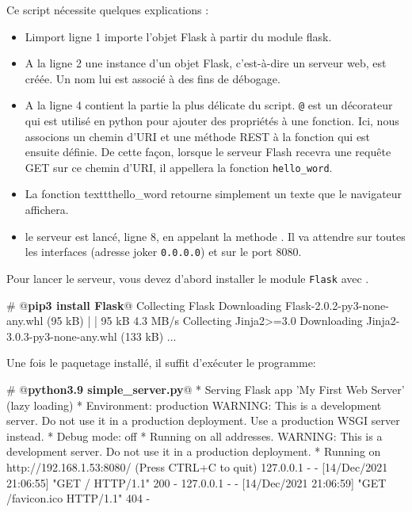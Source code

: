  
 Ce script nécessite quelques explications :

\begin{itemize}
    \item Limport ligne 1 importe l'objet Flask à partir du module flask.
    \item A la ligne 2 une instance d'un objet Flask, c'est-à-dire un serveur web, est créée. Un nom lui est associé à des fins de débogage.
    \item A la ligne 4 contient la partie la plus délicate du script. \texttt{@} est un décorateur qui est utilisé en python pour ajouter des propriétés à une fonction. Ici, nous associons un chemin d'URI et une méthode REST à la fonction qui est ensuite définie. De cette façon, lorsque le serveur Flash recevra une requête GET sur ce chemin d'URI, il appellera la fonction \texttt{hello\_word}.
    \item La fonction texttt{hello\_word} retourne simplement un texte que le navigateur affichera.
    \item le serveur est lancé, ligne 8, en appelant la methode . Il va attendre sur toutes les interfaces (adresse joker \texttt{0.0.0.0}) et sur le port 8080. 
\end{itemize}

  \vspace{1em}

Pour lancer le serveur, vous devez d'abord installer le module \texttt{Flask} avec \texttt{}.

\begin{termc}[backgroundcolor=\color{palerod}, language=json, basicstyle=\ttfamily\small, escapechar=@]
# @\textbf{pip3 install Flask}@
Collecting Flask
  Downloading Flask-2.0.2-py3-none-any.whl (95 kB)
     |                                  | 95 kB 4.3 MB/s 
Collecting Jinja2>=3.0
  Downloading Jinja2-3.0.3-py3-none-any.whl (133 kB)
...
\end{termc}

  \vspace{1em}

Une fois le paquetage installé, il suffit d'exécuter le programme:
\begin{termc}[backgroundcolor=\color{palerod}, language=json, basicstyle=\ttfamily\small, escapechar=@]
# @\textbf{python3.9 simple\_server.py}@
 * Serving Flask app 'My First Web Server' (lazy loading)
 * Environment: production
   WARNING: This is a development server. Do not use it in a production
   deployment.
   Use a production WSGI server instead.
 * Debug mode: off
 * Running on all addresses.
   WARNING: This is a development server. Do not use it in a production
   deployment.
 * Running on http://192.168.1.53:8080/ (Press CTRL+C to quit)
127.0.0.1 - - [14/Dec/2021 21:06:55] "GET / HTTP/1.1" 200 -
127.0.0.1 - - [14/Dec/2021 21:06:59] "GET /favicon.ico HTTP/1.1" 404 -
\end{termc}



